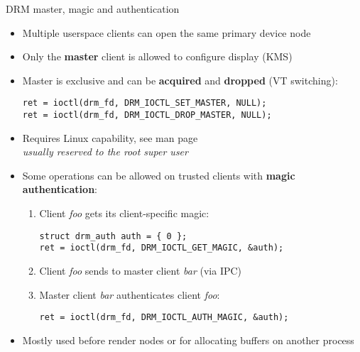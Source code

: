 \begin{frame}[fragile]{DRM master, magic and authentication}
  \begin{itemize}
  \item Multiple userspace clients can open the same primary device node
  \item Only the \textbf{master} client is allowed to configure display (KMS)
  \item Master is exclusive and can be \textbf{acquired} and \textbf{dropped} (VT switching):
  \begin{verbatim}
ret = ioctl(drm_fd, DRM_IOCTL_SET_MASTER, NULL);
ret = ioctl(drm_fd, DRM_IOCTL_DROP_MASTER, NULL);
  \end{verbatim}
  \item Requires  Linux capability, see  man page\\
    \textit{usually reserved to the root super user}
  \item Some operations can be allowed on trusted clients with \textbf{magic authentication}:
  \begin{enumerate}
  \item Client \textit{foo} gets its client-specific magic:
  \begin{verbatim}
struct drm_auth auth = { 0 };
ret = ioctl(drm_fd, DRM_IOCTL_GET_MAGIC, &auth);
  \end{verbatim}
  \item Client \textit{foo} sends  to master client \textit{bar} (via IPC)
  \item Master client \textit{bar} authenticates client \textit{foo}:
  \begin{verbatim}
ret = ioctl(drm_fd, DRM_IOCTL_AUTH_MAGIC, &auth);
  \end{verbatim}
  \end{enumerate}
  \item Mostly used before render nodes or for allocating buffers on another process
  \end{itemize}
\end{frame}

